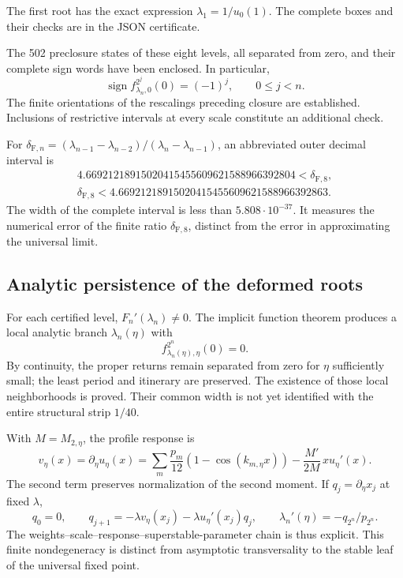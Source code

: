 The first root has the exact expression \(\lambda_1=1/u_0(1)\). The complete boxes and their checks are in the JSON certificate.

The 502 preclosure states of these eight levels, all separated from zero, and their complete sign words have been enclosed. In particular,
\[
\operatorname{sign}f_{\lambda_n,0}^{2^j}(0)=(-1)^j,\qquad0\le j<n.
\]
The finite orientations of the rescalings preceding closure are established. Inclusions of restrictive intervals at every scale constitute an additional check.

For \(\delta_{\mathrm F,n}=(\lambda_{n-1}-\lambda_{n-2})/(\lambda_n-\lambda_{n-1})\), an abbreviated outer decimal interval is
\[
\boxed{\begin{gathered}
4.66921218915020415455609621588966392804<\delta_{\mathrm F,8},\\
\delta_{\mathrm F,8}<4.66921218915020415455609621588966392863.
\end{gathered}}
\]
The width of the complete interval is less than \(5.808\cdot10^{-37}\). It measures the numerical error of the finite ratio \(\delta_{\mathrm F,8}\), distinct from the error in approximating the universal limit.


\subsection{Analytic persistence of the deformed roots}
\label{hmtfg:desarrollo:8}

For each certified level, \(F_n'(\lambda_n)\ne0\). The implicit function theorem produces a local analytic branch \(\lambda_n(\eta)\) with
\[
f_{\lambda_n(\eta),\eta}^{2^n}(0)=0.
\]
By continuity, the proper returns remain separated from zero for \(\eta\) sufficiently small; the least period and itinerary are preserved. The existence of those local neighborhoods is proved. Their common width is not yet identified with the entire structural strip \(1/40\).

With \(M=M_{2,\eta}\), the profile response is
\[
v_\eta(x)=\partial_\eta u_\eta(x)
=\sum_m\frac{p_m}{12}(1-\cos(k_{m,\eta}x))
-\frac{M'}{2M}\,x u_\eta'(x).
\]
The second term preserves normalization of the second moment. If \(q_j=\partial_\eta x_j\) at fixed \(\lambda\),
\[
q_0=0,\qquad q_{j+1}=-\lambda v_\eta(x_j)-\lambda u_\eta'(x_j)q_j,
\qquad
\boxed{\lambda_n'(\eta)=-q_{2^n}/p_{2^n}}.
\]
The weights–scale–response–superstable-parameter chain is thus explicit. This finite nondegeneracy is distinct from asymptotic transversality to the stable leaf of the universal fixed point.


